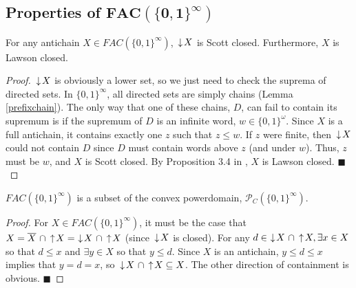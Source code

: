 \subsection[Properties of $FAC(\{0,1\}^\infty)$]{Properties of $\boldsymbol{FAC(\{0,1\}^\infty)}$}

\begin{lemma}\label{lawsonclosed}
For any antichain $X \in FAC(\{0,1\}^\infty)$, $\,\downarrow\! X$ is Scott closed.  Furthermore, $X$ is Lawson closed.
\end{lemma}
\begin{proof}
$\,\downarrow\! X$ is obviously a lower set, so we just need to check the suprema of directed sets.  In $\{0,1\}^\infty$, all directed sets are simply chains (Lemma \ref{prefixchain}).  The only way that one of these chains, $D$, can fail to contain its supremum is if the supremum of $D$ is an infinite word, $w\in \{0,1\}^\omega$.  Since $X$ is a full antichain, it contains exactly one $z$ such that $z\leq w$.  If $z$ were finite, then $\,\downarrow\! X$ could not contain $D$ since $D$ must contain words above $z$ (and under $w$).  Thus, $z$ must be $w$, and $X$ is Scott closed.   By Proposition 3.4 in \cite{mislove2014anatomy}, $X$ is Lawson closed. \hfill $\blacksquare$
\end{proof} 

\begin{lemma}
$FAC(\{0,1\}^\infty)$ is a subset of the convex powerdomain, $\mathcal{P}_C(\{0,1\}^\infty)$.
\end{lemma}
\begin{proof}
For $X\in FAC(\{0,1\}^\infty)$, it must be the case that $X = \overline{X}\ \cap \ua X =\, \da X\ \cap \ua X$ (since $\,\downarrow\! X$ is closed).  For any $d\in\, \,\downarrow\! X\ \cap \,\uparrow\! X, \exists x\in X$ so that $d\leq x$ and $\exists y\in X$ so that $y\leq d$.  Since $X$ is an antichain, $y\leq d \leq x$ implies that $y = d = x$, so $\,\downarrow\! X\ \cap \,\uparrow\! X \subseteq X$.  The other direction of containment is obvious.
\hfill $\blacksquare$
\end{proof}

